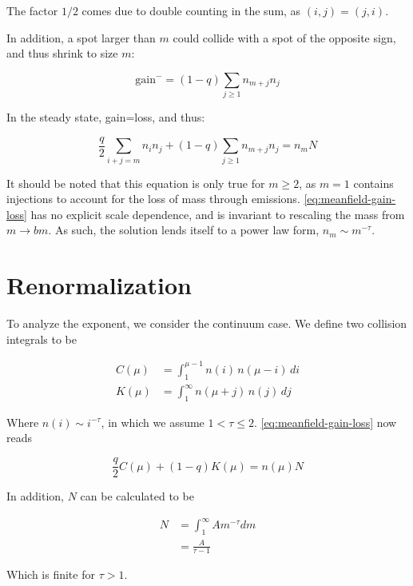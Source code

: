 \documentclass[aps, pre, reprint]{revtex4-2}
\begin{document}
The factor $1/2$ comes due to double counting in the sum, as $(i,\!j)=(j,\!i)$.

In addition, a spot larger than $m$ could collide with a spot of the opposite sign, and thus shrink to size $m$:

\begin{equation}
    \textrm{gain}^- = (1-q) \sum_{j\geq1} n_{m+j} n_j
\end{equation}

In the steady state, gain=loss, and thus:

\begin{equation} \label{eq:meanfield-gain-loss}
    \frac{q}{2}\sum_{i+j=m} n_i n_j + (1-q)\sum_{j\ge1} n_{m+j} n_j = n_m N
\end{equation}

It should be noted that this equation is only true for $m\geq2$, as $m=1$ contains injections to account for the loss of mass through emissions. \autoref{eq:meanfield-gain-loss} has no explicit scale dependence, and is invariant to rescaling the mass from $m\to bm$. As such, the solution lends itself to a power law form, $n_m \sim m^{-\tau}$.

\section{Renormalization}

To analyze the exponent, we consider the continuum case. We define two collision integrals to be

\begin{align}
    C(\mu) &= \int_1^{\mu-1} n(i)\,n(\mu-i)\,di \\
    K(\mu) &= \int_1^{\infty} n(\mu+j)\,n(j)\,dj
\end{align}

Where $n(i)\sim i^{-\tau}$, in which we assume $1<\tau\leq 2$. \autoref{eq:meanfield-gain-loss} now reads

\begin{equation} \label{eq:renormalization-gain-loss}
    \frac{q}{2}C(\mu) + (1-q)K(\mu) = n(\mu) N
\end{equation}

In addition, $N$ can be calculated to be

\begin{align}
    N &= \int_1^\infty A m^{-\tau} dm \\
    &= \frac{A}{\tau-1}
\end{align}

Which is finite for $\tau > 1$.
\end{document}
